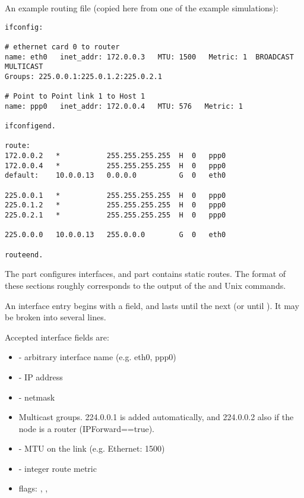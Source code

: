 An example routing file (copied here from one of the example simulations):

\begin{verbatim}
ifconfig:

# ethernet card 0 to router
name: eth0   inet_addr: 172.0.0.3   MTU: 1500   Metric: 1  BROADCAST MULTICAST
Groups: 225.0.0.1:225.0.1.2:225.0.2.1

# Point to Point link 1 to Host 1
name: ppp0   inet_addr: 172.0.0.4   MTU: 576   Metric: 1

ifconfigend.

route:
172.0.0.2   *           255.255.255.255  H  0   ppp0
172.0.0.4   *           255.255.255.255  H  0   ppp0
default:    10.0.0.13   0.0.0.0          G  0   eth0

225.0.0.1   *           255.255.255.255  H  0   ppp0
225.0.1.2   *           255.255.255.255  H  0   ppp0
225.0.2.1   *           255.255.255.255  H  0   ppp0

225.0.0.0   10.0.0.13   255.0.0.0        G  0   eth0

routeend.
\end{verbatim}

The  part configures interfaces,
and  part contains static routes.
The format of these sections roughly corresponds to the output
of the  and  Unix commands.

An interface entry begins with a  field, and lasts until
the next  (or until ). It may
be broken into several lines.

Accepted interface fields are:

\begin{itemize}
  \item {} - arbitrary interface name (e.g. eth0, ppp0)
  \item {} - IP address
  \item {} - netmask
  \item {} Multicast groups. 224.0.0.1 is added automatically,
     and 224.0.0.2 also if the node is a router (IPForward==true).
  \item {} - MTU on the link (e.g. Ethernet: 1500)
  \item {} - integer route metric
  \item flags: , , 
\end{itemize}

